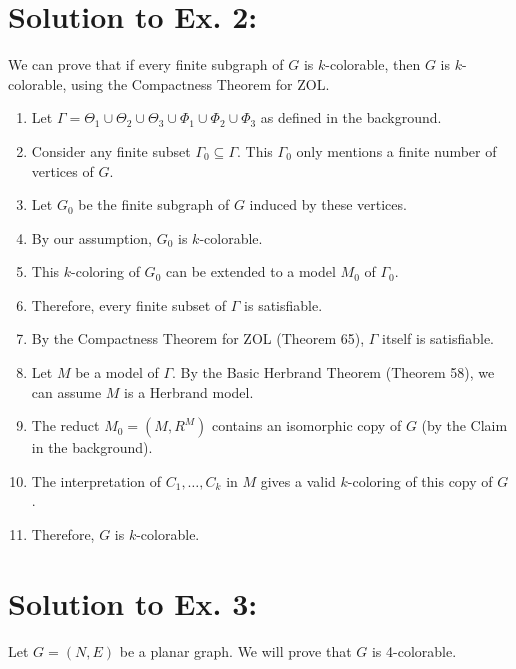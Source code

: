 \documentclass{article}
\newenvironment{proof}
{\begin{mdframed}[linewidth=0.5pt]\begin{enumerate}[label=\arabic*.,leftmargin=*]}
{\end{enumerate}\end{mdframed}}
\begin{document}
\section*{Solution to Ex. 2:}
We can prove that if every finite subgraph of $G$ is $k$-colorable, then $G$ is $k$-colorable, using the Compactness Theorem for ZOL.
\begin{proof}
    
    
    \item Let $\Gamma = \Theta_1 \cup \Theta_2 \cup \Theta_3 \cup \Phi_1 \cup \Phi_2 \cup \Phi_3$ as defined in the background.
    
    \item Consider any finite subset $\Gamma_0 \subseteq \Gamma$. This $\Gamma_0$ only mentions a finite number of vertices of $G$.
    
    \item Let $G_0$ be the finite subgraph of $G$ induced by these vertices.
    
    \item By our assumption, $G_0$ is $k$-colorable.
    
    \item This $k$-coloring of $G_0$ can be extended to a model $M_0$ of $\Gamma_0$.
    
    \item Therefore, every finite subset of $\Gamma$ is satisfiable.
    
    \item By the Compactness Theorem for ZOL (Theorem 65), $\Gamma$ itself is satisfiable.
    
    \item Let $M$ be a model of $\Gamma$. By the Basic Herbrand Theorem (Theorem 58), we can assume $M$ is a Herbrand model.
    
    \item The reduct $M_0 = (M, R^M)$ contains an isomorphic copy of $G$ (by the Claim in the background).
    
    \item The interpretation of $C_1, \ldots, C_k$ in $M$ gives a valid $k$-coloring of this copy of $G$.
    
    \item Therefore, $G$ is $k$-colorable.
    \end{proof}

\newpage

\section*{Solution to Ex. 3:}
    Let $G = (N, E)$ be a planar graph. We will prove that $G$ is 4-colorable.
\end{document}
